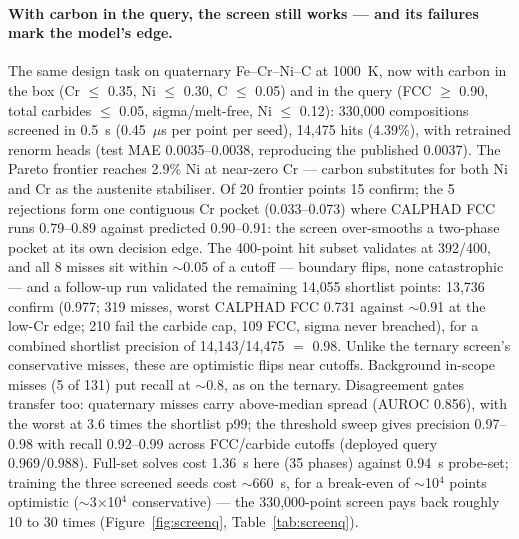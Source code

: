 \documentclass[preprint,12pt,authoryear]{elsarticle}
\begin{document}
\begin{table}[htbp]
\centering
\caption{Application case: lean-Ni austenitic screen at 1000~K on
Fe--Cr--Ni. Break-even is the one-time cost (data generation at measured
versus prose per-point cost, plus probe and 268~s training) divided by
the measured 0.41~s per-point full-set saving.}
\label{tab:screen}
\small

\end{table}

\paragraph{With carbon in the query, the screen still works --- and its
failures mark the model's edge.}
The same design task on quaternary Fe--Cr--Ni--C at 1000~K, now with
carbon in the box (Cr $\le$ 0.35, Ni $\le$ 0.30, C $\le$ 0.05) and in
the query (FCC $\ge$ 0.90, total carbides $\le$ 0.05, sigma/melt-free,
Ni $\le$ 0.12): 330{,}000 compositions screened in 0.5~s
(0.45~$\mu$s per point per seed), 14{,}475 hits (4.39\%), with retrained
renorm heads (test MAE 0.0035--0.0038, reproducing the published 0.0037).
The Pareto frontier reaches 2.9\% Ni at near-zero Cr --- carbon
substitutes for both Ni and Cr as the austenite stabiliser. Of 20
frontier points 15 confirm; the 5 rejections form one contiguous Cr
pocket (0.033--0.073) where CALPHAD FCC runs 0.79--0.89 against
predicted 0.90--0.91: the screen over-smooths a two-phase pocket at its
own decision edge. The 400-point hit subset validates at 392/400, and
all 8 misses sit within $\sim$0.05 of a cutoff --- boundary flips, none
catastrophic --- and a follow-up run validated the remaining 14{,}055
shortlist points: 13{,}736 confirm (0.977; 319 misses, worst CALPHAD
FCC 0.731 against $\sim$0.91 at the low-Cr edge; 210 fail the carbide
cap, 109 FCC, sigma never breached), for a combined shortlist precision
of 14{,}143/14{,}475 $=$ 0.98. Unlike the ternary screen's conservative
misses, these are optimistic flips near cutoffs. Background in-scope misses (5 of 131) put recall at
$\sim$0.8, as on the ternary. Disagreement gates transfer too:
quaternary misses carry above-median spread (AUROC 0.856), with the worst
at 3.6 times the shortlist p99; the threshold sweep gives precision
0.97--0.98 with recall 0.92--0.99 across FCC/carbide cutoffs (deployed
query 0.969/0.988). Full-set solves cost 1.36~s here (35
phases) against 0.94~s probe-set; training the three screened seeds
cost $\sim$660~s, for a break-even of $\sim$10$^4$ points optimistic
($\sim$3$\times$10$^4$ conservative) --- the 330{,}000-point screen pays
back roughly 10 to 30 times (Figure~\ref{fig:screenq},
Table~\ref{tab:screenq}).
\end{document}
